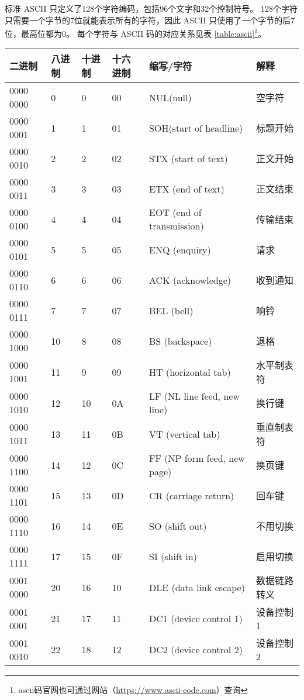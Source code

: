 标准 ASCII 只定义了128个字符编码，包括96个文字和32个控制符号。
128个字符只需要一个字节的7位就能表示所有的字符，因此 ASCII 只使用了一个字节的后7位，最高位都为0。
每个字符与 ASCII 码的对应关系见表 \ref{table:ascii}\footnote{ascii码官网也可通过网站（\url{https://www.ascii-code.com}）查询}。

\begin{longtable}{| p{.10\linewidth} | p{.08\linewidth} | p{.08\linewidth} | p{.10\linewidth} | p{.28\linewidth} | p{.15\linewidth} |}
\hline
\tableheadcolor
\textbf{二进制} & \textbf{八进制} & \textbf{十进制} & \textbf{十六进制} & \textbf{缩写/字符} & \textbf{解释} \\
\hline
0000 0000 & 0 & 0 & 00 & NUL(null) & 空字符 \\ \hline
0000 0001 & 1 & 1 & 01 & SOH(start of headline) & 标题开始 \\ \hline
0000 0010 & 2 & 2 & 02 & STX (start of text) & 正文开始 \\ \hline
0000 0011 & 3 & 3 & 03 & ETX (end of text) & 正文结束 \\ \hline
0000 0100 & 4 & 4 & 04 & EOT (end of transmission) & 传输结束 \\ \hline
0000 0101 & 5 & 5 & 05 & ENQ (enquiry) & 请求 \\ \hline
0000 0110 & 6 & 6 & 06 & ACK (acknowledge) & 收到通知 \\ \hline
0000 0111 & 7 & 7 & 07 & BEL (bell) & 响铃 \\ \hline
0000 1000 & 10 & 8 & 08 & BS (backspace) & 退格 \\ \hline
0000 1001 & 11 & 9 & 09 & HT (horizontal tab) & 水平制表符 \\ \hline
0000 1010 & 12 & 10 & 0A & LF (NL line feed, new line) & 换行键 \\ \hline
0000 1011 & 13 & 11 & 0B & VT (vertical tab) & 垂直制表符 \\ \hline
0000 1100 & 14 & 12 & 0C & FF (NP form feed, new page) & 换页键 \\ \hline
0000 1101 & 15 & 13 & 0D & CR (carriage return) & 回车键 \\ \hline
0000 1110 & 16 & 14 & 0E & SO (shift out) & 不用切换 \\ \hline
0000 1111 & 17 & 15 & 0F & SI (shift in) & 启用切换 \\ \hline
0001 0000 & 20 & 16 & 10 & DLE (data link escape) & 数据链路转义 \\ \hline
0001 0001 & 21 & 17 & 11 & DC1 (device control 1) & 设备控制1 \\ \hline
0001 0010 & 22 & 18 & 12 & DC2 (device control 2) & 设备控制2 \\ \hline

\end{longtable}
